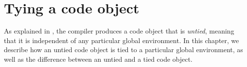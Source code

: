 \chapter{Tying a code object}
\label{chap-tying-a-code-object}

As explained in , the compiler produces a code
object  that is
\emph{untied}, meaning that it is independent of any particular global
environment.  In this chapter, we describe how an untied code object
is tied to a particular global environment, as well as the difference
between an untied and a tied code object.
